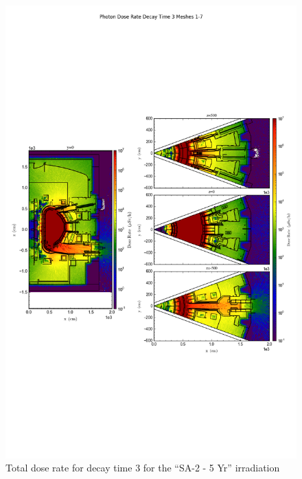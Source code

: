 \documentclass[12pt]{article}
\begin{document}
\clearpage
\begin{figure}[ht!]
\centering
\includegraphics[trim={0cm 8cm, 0cm 8cm},clip,scale=0.75]{../plots/final_model_with_b4c/10year/Photon_Dose_Rate_Decay_Time_3_Meshes_1-7.png}
\caption{Total dose rate for decay time 3 for the ``SA-2 - 5 Yr'' irradiation}
\label{fig:photons_10y_dc3_b4c_dose}
\end{figure}
\end{document}
